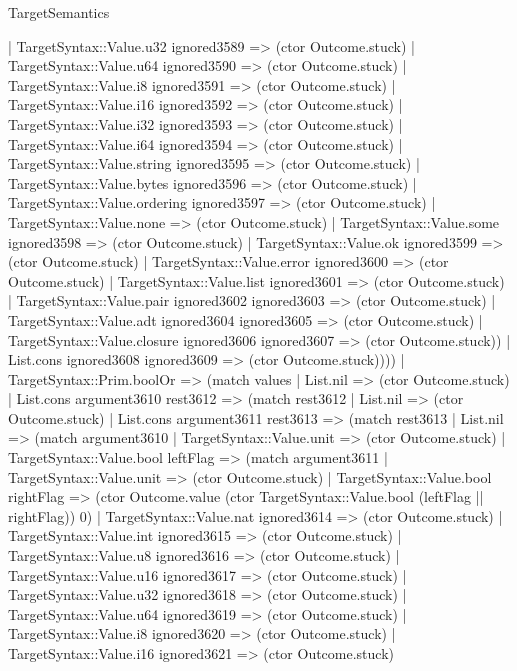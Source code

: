 \begin{lexlean}{TargetSemantics}
\begin{semanticmodule}
{            | TargetSyntax::Value.u32 ignored3589 => (ctor Outcome.stuck)
            | TargetSyntax::Value.u64 ignored3590 => (ctor Outcome.stuck)
            | TargetSyntax::Value.i8 ignored3591 => (ctor Outcome.stuck)
            | TargetSyntax::Value.i16 ignored3592 => (ctor Outcome.stuck)
            | TargetSyntax::Value.i32 ignored3593 => (ctor Outcome.stuck)
            | TargetSyntax::Value.i64 ignored3594 => (ctor Outcome.stuck)
            | TargetSyntax::Value.string ignored3595 => (ctor Outcome.stuck)
            | TargetSyntax::Value.bytes ignored3596 => (ctor Outcome.stuck)
            | TargetSyntax::Value.ordering ignored3597 => (ctor Outcome.stuck)
            | TargetSyntax::Value.none => (ctor Outcome.stuck)
            | TargetSyntax::Value.some ignored3598 => (ctor Outcome.stuck)
            | TargetSyntax::Value.ok ignored3599 => (ctor Outcome.stuck)
            | TargetSyntax::Value.error ignored3600 => (ctor Outcome.stuck)
            | TargetSyntax::Value.list ignored3601 => (ctor Outcome.stuck)
            | TargetSyntax::Value.pair ignored3602 ignored3603 => (ctor Outcome.stuck)
            | TargetSyntax::Value.adt ignored3604 ignored3605 => (ctor Outcome.stuck)
            | TargetSyntax::Value.closure ignored3606 ignored3607 => (ctor Outcome.stuck))
          | List.cons ignored3608 ignored3609 => (ctor Outcome.stuck))))
    | TargetSyntax::Prim.boolOr => (match values
      | List.nil => (ctor Outcome.stuck)
      | List.cons argument3610 rest3612 => (match rest3612
        | List.nil => (ctor Outcome.stuck)
        | List.cons argument3611 rest3613 => (match rest3613
          | List.nil => (match argument3610
            | TargetSyntax::Value.unit => (ctor Outcome.stuck)
            | TargetSyntax::Value.bool leftFlag => (match argument3611
              | TargetSyntax::Value.unit => (ctor Outcome.stuck)
              | TargetSyntax::Value.bool rightFlag => (ctor Outcome.value (ctor TargetSyntax::Value.bool (leftFlag || rightFlag)) 0)
              | TargetSyntax::Value.nat ignored3614 => (ctor Outcome.stuck)
              | TargetSyntax::Value.int ignored3615 => (ctor Outcome.stuck)
              | TargetSyntax::Value.u8 ignored3616 => (ctor Outcome.stuck)
              | TargetSyntax::Value.u16 ignored3617 => (ctor Outcome.stuck)
              | TargetSyntax::Value.u32 ignored3618 => (ctor Outcome.stuck)
              | TargetSyntax::Value.u64 ignored3619 => (ctor Outcome.stuck)
              | TargetSyntax::Value.i8 ignored3620 => (ctor Outcome.stuck)
              | TargetSyntax::Value.i16 ignored3621 => (ctor Outcome.stuck)
}
\end{semanticmodule}
\end{lexlean}

